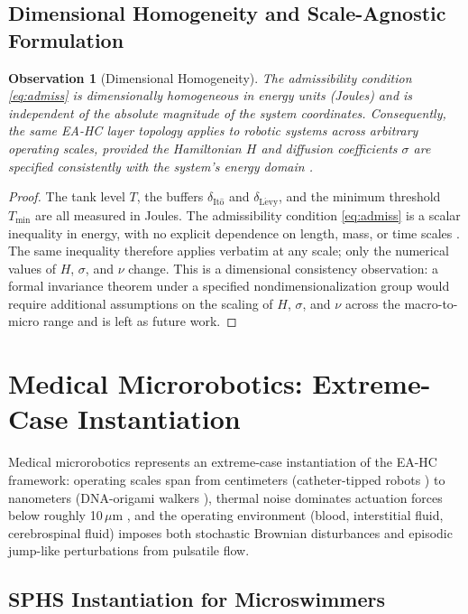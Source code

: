 \documentclass[11pt]{article}
\newtheorem{observation}{Observation}
\begin{document}
\subsection{Dimensional Homogeneity and Scale-Agnostic Formulation}

\begin{observation}[Dimensional Homogeneity]
\label{obs:scale}
The admissibility condition \eqref{eq:admiss} is dimensionally homogeneous in energy units
(Joules) and is independent of the absolute magnitude of the system coordinates.
Consequently, the same EA-HC layer topology applies to robotic systems across arbitrary
operating scales, provided the Hamiltonian $H$ and diffusion coefficients $\sigma$ are
specified consistently with the system's energy domain \cite{vanderschaft2014,goldstein2002}.
\end{observation}

\begin{proof}
The tank level $T$, the buffers $\delta_{\mathrm{It\hat{o}}}$ and
$\delta_{\mathrm{L\acute{e}vy}}$, and the minimum threshold $T_{\min}$ are all measured in
Joules. The admissibility condition \eqref{eq:admiss} is a scalar inequality in energy, with no
explicit dependence on length, mass, or time scales \cite{vanderschaft2014}. The same
inequality therefore applies verbatim at any scale; only the numerical values of $H$, $\sigma$,
and $\nu$ change. This is a dimensional consistency observation: a formal invariance theorem
under a specified nondimensionalization group would require additional assumptions on the
scaling of $H$, $\sigma$, and $\nu$ across the macro-to-micro range and is left as future work.
\end{proof}

\section{Medical Microrobotics: Extreme-Case Instantiation}
\label{sec:micro}

Medical microrobotics represents an extreme-case instantiation of the EA-HC framework:
operating scales span from centimeters (catheter-tipped robots \cite{sitti2018}) to nanometers
(DNA-origami walkers \cite{douglas2009}), thermal noise dominates actuation forces below
roughly 10\,$\mu$m \cite{purcell1977}, and the operating environment (blood, interstitial fluid,
cerebrospinal fluid) imposes both stochastic Brownian disturbances and episodic jump-like
perturbations from pulsatile flow.

\subsection{SPHS Instantiation for Microswimmers}
\end{document}
